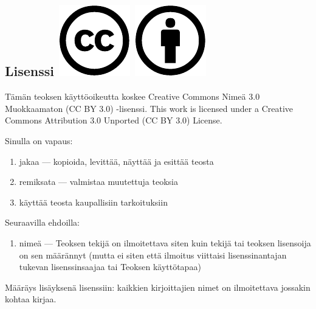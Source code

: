 \subsection*{Lisenssi \includegraphics[scale=0.3]{content/pictures/cc.pdf} \includegraphics[scale=0.3]{content/pictures/by.pdf}}

Tämän teoksen käyttöoikeutta koskee Creative Commons Nimeä 3.0 Muokkaamaton (CC BY 3.0) -lisenssi.
This work is licensed under a Creative Commons Attribution 3.0 Unported (CC BY 3.0) License.


Sinulla on vapaus:
\begin{enumerate}
\item jakaa — kopioida, levittää, näyttää ja esittää teosta
\item remiksata — valmistaa muutettuja teoksia
\item käyttää teosta kaupallisiin tarkoituksiin
\end{enumerate}
Seuraavilla ehdoilla:
\begin{enumerate}
\item nimeä — Teoksen tekijä on ilmoitettava siten kuin tekijä tai teoksen lisensoija on sen määrännyt (mutta ei siten että ilmoitus viittaisi lisenssinantajan tukevan lisenssinsaajaa tai Teoksen käyttötapaa)
\end{enumerate}

Määräys lisäyksenä lisenssiin: kaikkien kirjoittajien nimet on ilmoitettava jossakin kohtaa kirjaa.



